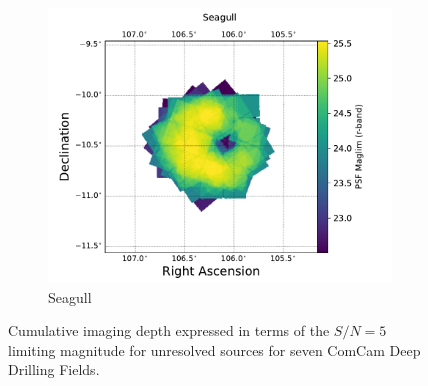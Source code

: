\begin{figure}[htbp]
    \hfill
    \begin{subfigure}[b]{0.3\textwidth}
        \centering
        \includegraphics[width=\textwidth]{comcam_psf_maglim_seagull_r}
        \caption{Seagull}
        \label{fig:img8}
    \end{subfigure}
     \caption{Cumulative imaging depth expressed in terms of the $S/N=5$ limiting magnitude for unresolved sources for seven ComCam Deep Drilling Fields.}
     \label{fig:dp1_fields_psf_maglim}
\end{figure}
